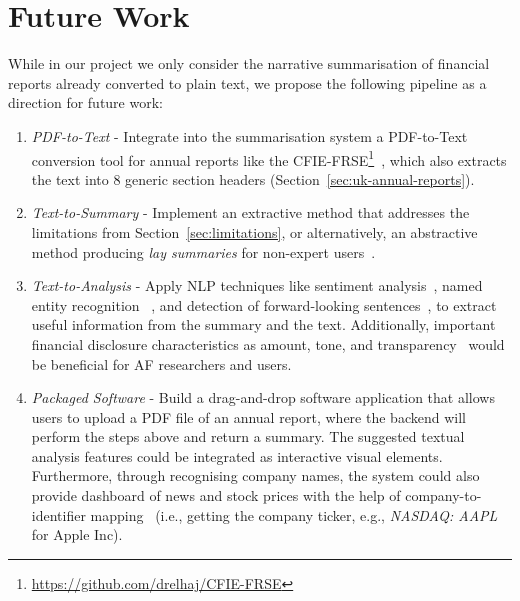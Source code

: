 \section{Future Work}\label{sec:future-work}
While in our project we only consider the narrative summarisation of
financial reports already converted to plain text, we propose the following pipeline as a direction for future work:
\begin{enumerate}
    \item \emph{PDF-to-Text} - Integrate into the summarisation system a PDF-to-Text conversion tool for annual
    reports like the CFIE-FRSE\footnote{\url{https://github.com/drelhaj/CFIE-FRSE}}~\cite{elhaj2019multilingual}, which
    also extracts the text into 8 generic section headers (Section~\ref{sec:uk-annual-reports}).
    \item \emph{Text-to-Summary} - Implement an extractive method that addresses the limitations from Section~\ref{sec:limitations},
    or alternatively, an abstractive method producing \emph{lay summaries} for non-expert users~\cite{vinzelberg2023lay, Guo2020AutomatedLL}.
    \item \emph{Text-to-Analysis} - Apply NLP techniques like sentiment analysis~\cite{araci2019finbert}, named entity recognition
   ~\cite{zhang2022finbertmrc}, and detection of forward-looking sentences~\cite{stihec-etal-2021-preliminary},
    to extract useful information from the summary and the text.
    Additionally, important financial disclosure characteristics as amount, tone, and transparency~\cite{li2010textual, Li2011TextualAO}
    would be beneficial for AF researchers and users.
    \item \emph{Packaged Software} - Build a drag-and-drop software application that allows users to upload a PDF file of an
    annual report, where the backend will perform the steps above and return a summary.
    The suggested textual analysis features could be integrated as interactive visual elements.
    Furthermore, through recognising company names, the system could also provide dashboard of news and stock prices
    with the help of company-to-identifier mapping~\cite{el-haj2019retrieving}
    (i.e., getting the company ticker, e.g., \emph{NASDAQ: AAPL} for Apple Inc).
\end{enumerate}